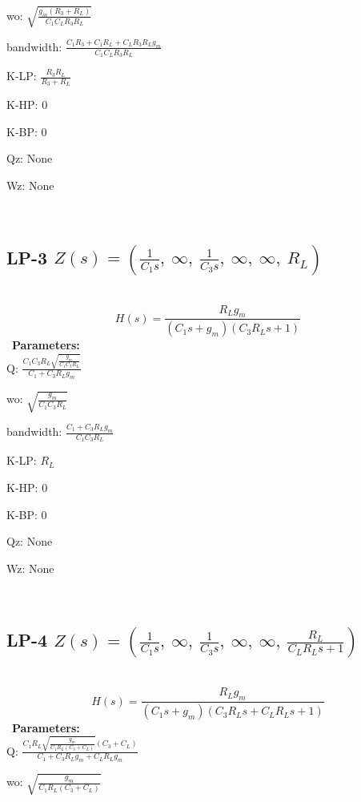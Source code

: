 \documentclass{article}
\begin{document}
wo: $\sqrt{\frac{g_{m} \left(R_{3} + R_{L}\right)}{C_{1} C_{L} R_{3} R_{L}}}$\ 

bandwidth: $\frac{C_{1} R_{3} + C_{1} R_{L} + C_{L} R_{3} R_{L} g_{m}}{C_{1} C_{L} R_{3} R_{L}}$\ 

K-LP: $\frac{R_{3} R_{L}}{R_{3} + R_{L}}$\ 

K-HP: $0$\ 

K-BP: $0$\ 

Qz: $\text{None}$\ 

Wz: $\text{None}$\ 

\ 

\subsection{LP-3 $Z(s) = \left( \frac{1}{C_{1} s}, \  \infty, \  \frac{1}{C_{3} s}, \  \infty, \  \infty, \  R_{L}\right)$ } \ 
\textbf{\[H(s) = \frac{R_{L} g_{m}}{\left(C_{1} s + g_{m}\right) \left(C_{3} R_{L} s + 1\right)}\] } \ 
\textbf{Parameters:}\\ 

Q: $\frac{C_{1} C_{3} R_{L} \sqrt{\frac{g_{m}}{C_{1} C_{3} R_{L}}}}{C_{1} + C_{3} R_{L} g_{m}}$\ 

wo: $\sqrt{\frac{g_{m}}{C_{1} C_{3} R_{L}}}$\ 

bandwidth: $\frac{C_{1} + C_{3} R_{L} g_{m}}{C_{1} C_{3} R_{L}}$\ 

K-LP: $R_{L}$\ 

K-HP: $0$\ 

K-BP: $0$\ 

Qz: $\text{None}$\ 

Wz: $\text{None}$\ 

\ 

\subsection{LP-4 $Z(s) = \left( \frac{1}{C_{1} s}, \  \infty, \  \frac{1}{C_{3} s}, \  \infty, \  \infty, \  \frac{R_{L}}{C_{L} R_{L} s + 1}\right)$ } \ 
\textbf{\[H(s) = \frac{R_{L} g_{m}}{\left(C_{1} s + g_{m}\right) \left(C_{3} R_{L} s + C_{L} R_{L} s + 1\right)}\] } \ 
\textbf{Parameters:}\\ 

Q: $\frac{C_{1} R_{L} \sqrt{\frac{g_{m}}{C_{1} R_{L} \left(C_{3} + C_{L}\right)}} \left(C_{3} + C_{L}\right)}{C_{1} + C_{3} R_{L} g_{m} + C_{L} R_{L} g_{m}}$\ 

wo: $\sqrt{\frac{g_{m}}{C_{1} R_{L} \left(C_{3} + C_{L}\right)}}$\ 
\end{document}
